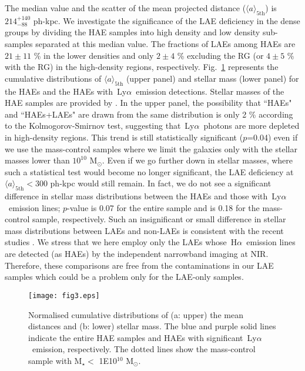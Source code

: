 \documentclass[letters,usenatbib]{mnras}
\def\lya{{\rm\,Ly$\alpha$}}
\def\ha{{\rm\,H$\alpha$}}
\def\msun{{\rm M}$_{\odot}$}
\begin{document}
The median value and the scatter of the mean projected distance 
($\langle{a}\rangle_\mathrm{5th}$) is $214_{-88}^{+140}$ ph-kpc. We investigate 
the significance of the LAE deficiency in the dense groups by dividing the HAE 
samples into high density and low density sub-samples separated at this median 
value. The fractions of LAEs among HAEs are $21\pm11$ \% in the lower densities 
and only $2\pm4$ \% excluding the RG (or $4\pm5$ \% with the RG) in the 
high-density regions, respectively. Fig.~\ref{fig3} represents the cumulative 
distributions of $\langle{a}\rangle_\mathrm{5th}$ (upper panel) and stellar mass 
(lower panel) for the HAEs and the HAEs with \lya\ emission detections. Stellar 
masses of the HAE samples are provided by \citet{Hayashi:2016}. In the upper 
panel, the possibility that ``HAEs" and ``HAEs+LAEs" are drawn from the same 
distribution is only 2 \% according to the Kolmogorov-Smirnov test, suggesting 
that \lya\ photons are more depleted in high-density regions. This trend is still 
statistically significant ($p$=0.04) even if we use the mass-control samples where 
we limit the galaxies only with the stellar masses lower than $10^{10}$ \msun. 
Even if we go further down in stellar masses, where such a statistical test would 
become no longer significant, the LAE deficiency at 
$\langle{a}\rangle_\mathrm{5th}<300$ ph-kpc would still remain. In fact, we do not 
see a significant difference in stellar mass distributions between the HAEs and 
those with \lya\ emission lines; $p$-value is 0.07 for the entire sample and is 
0.18 for the mass-control sample, respectively. Such an insignificant or small 
difference in stellar mass distributions between LAEs and non-LAEs is consistent 
with the recent studies \citep{Hagen:2016,Hathi:2016}. We stress that we here 
employ only the LAEs whose \ha\ emission lines are detected (as HAEs) by the 
independent narrowband imaging at NIR. Therefore, these comparisons are free from 
the contaminations in our LAE samples which could be a problem only for the 
LAE-only samples.

\begin{figure}
	\centering
	\texttt{[image: fig3.eps]}
    \caption{Normalised cumulative distributions of (a: upper) the mean distances 
    and (b: lower) stellar mass. The blue and purple solid lines indicate the 
    entire HAE samples and HAEs with significant \lya\ emission, respectively. The 
    dotted lines show the mass-control sample with M$_\star<$ 1E10$^{10}$ \msun.} 
    \label{fig3}
\end{figure}
\end{document}
